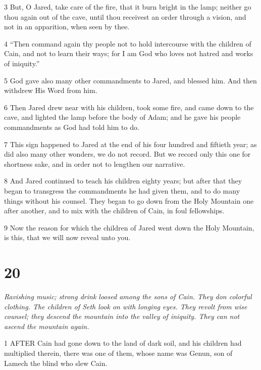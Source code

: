 \par 3 But, O Jared, take care of the fire, that it burn bright in the lamp; neither go thou again out of the cave, until thou receivest an order through a vision, and not in an apparition, when seen by thee.

\par 4 “Then command again thy people not to hold intercourse with the children of Cain, and not to learn their ways; for I am God who loves not hatred and works of iniquity.”

\par 5 God gave also many other commandments to Jared, and blessed him. And then withdrew His Word from him.

\par 6 Then Jared drew near with his children, took some fire, and came down to the cave, and lighted the lamp before the body of Adam; and he gave his people commandments as God had told him to do.

\par 7 This sign happened to Jared at the end of his four hundred and fiftieth year; as did also many other wonders, we do not record. But we record only this one for shortness sake, and in order not to lengthen our narrative.

\par 8 And Jared continued to teach his children eighty years; but after that they began to transgress the commandments he had given them, and to do many things without his counsel. They began to go down from the Holy Mountain one after another, and to mix with the children of Cain, in foul fellowships.

\par 9 Now the reason for which the children of Jared went down the Holy Mountain, is this, that we will now reveal unto you.



\chapter{20}

\par \textit{Ravishing music; strong drink loosed among the sons of Cain. They don colorful clothing. The children of Seth look on with longing eyes. They revolt from wise counsel; they descend the mountain into the valley of iniquity. They can not ascend the mountain again.}

\par 1 AFTER Cain had gone down to the land of dark soil, and his children had multiplied therein, there was one of them, whose name was Genun, son of Lamech the blind who slew Cain.

